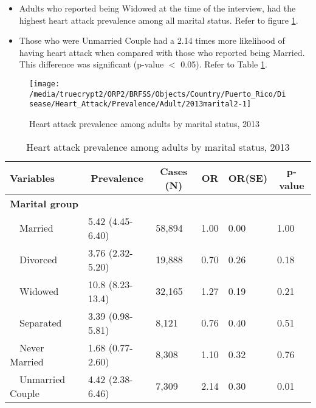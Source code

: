  \newpage
\begin{itemize}

\item Adults who reported being Widowed at the time of the interview, had the highest heart attack prevalence among all marital status. Refer to figure \ref{fig:marital.Heart_Attack.2013}.

\item Those who were Unmarried Couple had a 2.14 times more likelihood of having heart attack when compared with those who reported being Married. This difference was significant (p-value $<$ 0.05). Refer to Table \ref{tab:marital.Heart_Attack.2013}.

\end{itemize}

\begin{figure}[H]
\caption{Heart attack prevalence among adults by marital status,
         2013}
\label{fig:marital.Heart_Attack.2013}
\begin{knitrout}
\color{fgcolor}

{\centering \texttt{[image: /media/truecrypt2/ORP2/BRFSS/Objects/Country/Puerto\_Rico/Disease/Heart\_Attack/Prevalence/Adult/2013marital2-1]} 

}



\end{knitrout}
 \end{figure}

\begin{table}[H]
\caption{Heart attack prevalence  among adults by marital status, 2013\label{tab:marital.Heart_Attack.2013}} 
\begin{center}
\begin{tabular}{llllll}
\hline\hline
\multicolumn{1}{l}{Variables}&\multicolumn{1}{c}{Prevalence}&\multicolumn{1}{c}{Cases (N)}&\multicolumn{1}{c}{OR}&\multicolumn{1}{c}{OR(SE)}&\multicolumn{1}{c}{p-value}\tabularnewline
\hline
{\bfseries Marital group}&&&&&\tabularnewline
~~Married&5.42 (4.45-6.40)&58,894&1.00&0.00&1.00\tabularnewline
~~Divorced&3.76 (2.32-5.20)&19,888&0.70&0.26&0.18\tabularnewline
~~Widowed&10.8 (8.23-13.4)&32,165&1.27&0.19&0.21\tabularnewline
~~Separated&3.39 (0.98-5.81)& 8,121&0.76&0.40&0.51\tabularnewline
~~Never Married&1.68 (0.77-2.60)& 8,308&1.10&0.32&0.76\tabularnewline
~~Unmarried Couple&4.42 (2.38-6.46)& 7,309&2.14&0.30&0.01\tabularnewline
\hline
\end{tabular}\end{center}

\end{table}


